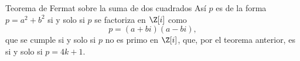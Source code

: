 \begin{frame}{Teorema de Fermat sobre la suma de dos cuadrados}
  Así $p$ es de la forma $p = a^2 + b^2$ \pause si y solo si $p$ se factoriza en $\Z[i]$ como
  \[
    p = (a+bi)(a-bi),
  \]
  \pause que se cumple si y solo si $p$ no es primo en $\Z[i]$, \pause que, por el teorema anterior, es si y solo si $p = 4k+1$.
\end{frame}